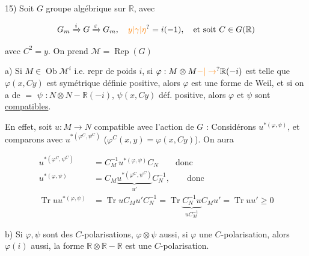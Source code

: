 15) Soit $G$ groupe algébrique sur $\mathbb R$,  avec

\[
G_m\xrightarrow{i}G\xrightarrow{\varepsilon}G_m,\quad\unsure{y|\gamma|\eta}=i(-1),\quad\text{et soit }C\in G(\mathbb R)
\]

avec $C^2=y$. On prend $\mathcal M=\operatorname{Rep}(G)$

 a) Si $M\in\operatorname{Ob}\mathcal M^i$ i.e.  repr de  poids $i$,  si $\varphi:M\otimes M\unsure{-|\to}\mathbb R(-i)$ est telle que $\varphi(x,Cy)$ est symétrique définie positive, alors $\varphi$ est une forme de Weil, et si on a de $=$ $\psi$ \deleted{\unsure{$\longmapsto$}} $:N\otimes N-\mathbb R(-i)$, $\psi(x,Cy)$ déf. positive, alors $\varphi$ et $\psi$ sont \uline{compatibles}.



En effet, soit $u:M\longrightarrow N$ compatible avec l'action de $G$ : Considérons $u^{*(\varphi,\psi)}$, et comparons avec $u^{*(\varphi^C,\psi^C)}$ ($\varphi^C(x,y)=\varphi(x,Cy)$). On aura

\[
\begin{aligned}
u^{*(\varphi^C,\psi^C)}&=C_M^{-1}u^{*(\varphi,\psi)}C_N\qquad\text{donc}\\
u^{*(\varphi,\psi)}&=C_M\underbrace{u^{*(\varphi^C,\psi^C)}}_{u'}C_N^{-1},\qquad\text{donc}\\
\operatorname{Tr}uu^{*(\varphi,\psi)}&=\operatorname{Tr}uC_Mu'C_N^{-1}
=\operatorname{Tr}\underbrace{C_N^{-1}u}_{uC_M^{-1}}C_Mu'=\operatorname{Tr}uu'\geq0
\end{aligned}
\]



b) Si $\varphi,\psi$ sont des $C$-polarisations, $\varphi\otimes\psi$ aussi, si $\varphi$ une $C$-polarisation, alors $\varphi(i)$ aussi,  la forme  $\mathbb R\otimes\mathbb R-\mathbb R$ est une $C$-polarisation.

